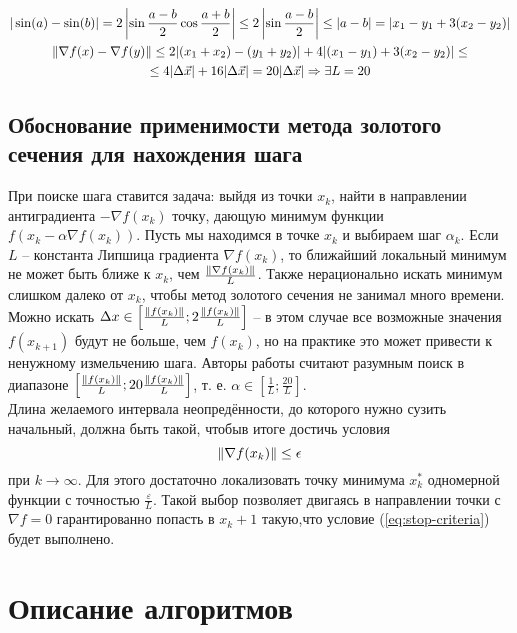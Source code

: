 \documentclass[main.tex]{subfiles}
\begin{document}
\begin{gather*}
|\sin(a) - \sin(b)| = 2 \left|\sin \frac{a-b}{2} \cos \frac{a+b}{2}\right| \le 2 \left|\sin\frac{a-b}{2}\right|\le |a-b|=|x_1-y_1 + 3(x_2-y_2)|\\
\left\lVert\nabla f(x)-\nabla f(y)\right\rVert \le 2 |(x_1+x_2)-(y_1+y_2)|+4|(x_1-y_1)+3(x_2-y_2)|\le \\
\le 4 |\Delta \vec{x}| + 16 |\Delta \vec{x}| = 20 |\Delta \vec{x}|  \Rightarrow \exists L = 20\\
\end{gather*}

\subsection{Обоснование применимости метода золотого сечения для нахождения шага}
При поиске шага ставится задача: выйдя из точки $x_k$, найти в направлении антиградиента $-\nabla f(x_k)$ точку, дающую минимум функции $f(x_k-\alpha \nabla f(x_k))$. 
Пусть мы находимся в точке $x_k$ и выбираем шаг $\alpha_k$. Если $L$ -- константа Липшица градиента $\nabla f(x_k)$, то ближайший локальный минимум не может быть ближе к $x_k$, чем $\frac{\left\lVert\nabla f(x_k)\right\rVert}{L}$. Также нерационально искать минимум слишком далеко от $x_k$, чтобы метод золотого сечения не занимал много времени. Можно искать $\Delta x \in \left[ \frac{\left\lVert f(x_k)\right\rVert}{L}; 2\frac{\left\lVert f(x_k)\right\rVert}{L}\right]$ -- в этом случае все возможные значения $f(x_{k+1})$ будут не больше, чем $f(x_k)$, но на практике это может привести к ненужному измельчению шага. Авторы работы считают разумным поиск в диапазоне $\left[ \frac{\left\lVert f(x_k)\right\rVert}{L}; 20\frac{\left\lVert f(x_k)\right\rVert}{L}\right]$, т. е. $\alpha \in \left[\frac{1}{L}; \frac{20}{L}\right]$. \\

Длина желаемого интервала неопредённости, до которого нужно сузить начальный, должна быть такой, чтобыв итоге достичь условия \\

\begin{equation}\label{eq:stop-criteria}
\left\lVert\nabla f(x_k)\right\rVert \le \epsilon
\end{equation}
 при $k \rightarrow \infty$. Для этого достаточно локализовать точку минимума $x_k^*$ одномерной функции с точностью $\frac{\varepsilon}{L}$. Такой выбор позволяет двигаясь в направлении точки с $\nabla f = 0$ гарантированно попасть в $x_k+1$ такую,что условие (\ref{eq:stop-criteria}) будет выполнено.

\section{Описание алгоритмов}

\end{document}
